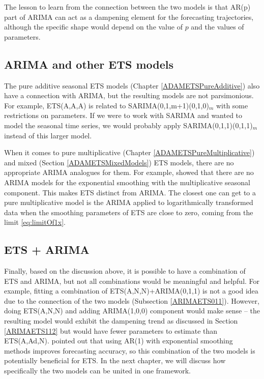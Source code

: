 \documentclass[
]{book}
\theoremstyle{definition}
\theoremstyle{definition}
\theoremstyle{definition}
\theoremstyle{definition}
\theoremstyle{remark}
\begin{document}
The lesson to learn from the connection between the two models is that AR(p) part of ARIMA can act as a dampening element for the forecasting trajectories, although the specific shape would depend on the value of \(p\) and the values of parameters.

\hypertarget{ARIMAETSOther}{%
\subsection{ARIMA and other ETS models}\label{ARIMAETSOther}}

The pure additive seasonal ETS models (Chapter \ref{ADAMETSPureAdditive}) also have a connection with ARIMA, but the resulting models are not parsimonious. For example, ETS(A,A,A) is related to SARIMA(0,1,m+1)(0,1,0)\(_m\) \citep{Mckenzie1976, Chatfield1977} with some restrictions on parameters. If we were to work with SARIMA and wanted to model the seasonal time series, we would probably apply SARIMA(0,1,1)(0,1,1)\(_m\) instead of this larger model.

When it comes to pure multiplicative (Chapter \ref{ADAMETSPureMultiplicative}) and mixed (Section \ref{ADAMETSMixedModels}) ETS models, there are no appropriate ARIMA analogues for them. For example, \citet{Chatfield1977} showed that there are no ARIMA models for the exponential smoothing with the multiplicative seasonal component. This makes ETS distinct from ARIMA. The closest one can get to a pure multiplicative model is the ARIMA applied to logarithmically transformed data when the smoothing parameters of ETS are close to zero, coming from the limit \eqref{eq:limitOf1x}.

\hypertarget{ets-arima}{%
\subsection{ETS + ARIMA}\label{ets-arima}}

Finally, based on the discussion above, it is possible to have a combination of ETS and ARIMA, but not all combinations would be meaningful and helpful. For example, fitting a combination of ETS(A,N,N)+ARIMA(0,1,1) is not a good idea due to the connection of the two models (Subsection \ref{ARIMAETS011}). However, doing ETS(A,N,N) and adding ARIMA(1,0,0) component would make sense -- the resulting model would exhibit the dampening trend as discussed in Section \ref{ARIMAETS112} but would have fewer parameters to estimate than ETS(A,Ad,N). \citet{Gardner1985} pointed out that using AR(1) with exponential smoothing methods improves forecasting accuracy, so this combination of the two models is potentially beneficial for ETS. In the next chapter, we will discuss how specifically the two models can be united in one framework.
\end{document}
